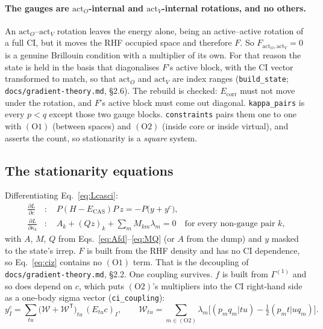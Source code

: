 \documentclass[11pt]{article}
\newcommand{\code}[1]{\texttt{#1}}
\newcommand{\G}[1]{\Gamma^{(#1)}}
\newcommand{\Ecas}{E_{\mathrm{CAS}}}
\newcommand{\Ecorr}{E_{\mathrm{corr}}}
\newcommand{\cons}[1]{\ensuremath{(\mathrm{#1})}}
\begin{document}
\paragraph{The gauges are $\mathrm{act}_O$-internal and $\mathrm{act}_V$-internal rotations, and no others.}
An $\mathrm{act}_O$--$\mathrm{act}_V$ rotation leaves the energy alone, being an
active--active rotation of a full CI, but it moves the RHF occupied space and
therefore $F$. So $F_{\mathrm{act}_O,\mathrm{act}_V} = 0$ is a genuine
Brillouin condition with a multiplier of its own. For that reason the state is
held in the basis that diagonalises $F$'s active block, with the CI vector
transformed to match, so that $\mathrm{act}_O$ and $\mathrm{act}_V$ are index
ranges (\code{build\_state}; \code{docs/gradient-theory.md}, \S2.6). The
rebuild is checked: $\Ecorr$ must not move under the rotation, and $F$'s
active block must come out diagonal. \code{kappa\_pairs} is every $p<q$ except
those two gauge blocks. \code{constraints} pairs them one to one with \cons{O1}
(between spaces) and \cons{O2} (inside core or inside virtual), and asserts
the count, so stationarity is a \emph{square} system.

\subsection{The stationarity equations}
Differentiating Eq.~\eqref{eq:Lcasci}:
\begin{align}
  \frac{\partial L}{\partial c}&:\quad P(H - \Ecas)P\,z = -P\bigl(y + y^c\bigr),
  \label{eq:ciz}\\
  \frac{\partial L}{\partial \kappa_k}&:\quad A_k + (Qz)_k + \sum_m M_{km}\lambda_m = 0
  \quad\text{for every non-gauge pair $k$},
  \label{eq:orbz}
\end{align}
with $A$, $M$, $Q$ from Eqs.~\eqref{eq:Afd}--\eqref{eq:MQ} (or $A$ from the
dump) and $y$ masked to the state's irrep. $F$ is built from the RHF density
and has no CI dependence, so Eq.~\eqref{eq:ciz} contains no $\cons{O1}$ term.
That is the decoupling of \code{docs/gradient-theory.md}, \S2.2. One coupling
survives. $f$ is built from $\G1$ and so does depend on $c$, which puts
\cons{O2}'s multipliers into the CI right-hand side as a one-body sigma vector
(\code{ci\_coupling}):
\begin{equation}
  y^c_I = \sum_{tu}\bigl(\mathcal W + \mathcal W^{\mathsf T}\bigr)_{tu}\,(E_{tu}c)_I,\qquad
  \mathcal W_{tu} = \sum_{m\in\cons{O2}} \lambda_m\bigl[(p_mq_m|tu) - \tfrac12(p_mt|uq_m)\bigr].
  \label{eq:yc}
\end{equation}
\end{document}
